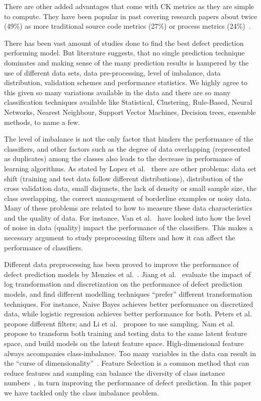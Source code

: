 \documentclass[sigconf,review, anonymous]{acmart}
\theoremstyle{break}
\theoremstyle{break}
\begin{document}
There are other added advantages that come with CK metrics as they are  simple  to  compute. They have been popular in past covering research papers about twice (49\%) 
as more traditional source code metrics (27\%) or process metrics (24\%)~\cite{radjenovic2013software}. 

There has been vast amount of studies done to find the best defect prediction performing model. But literature suggests, that no single prediction technique dominates and making sense of the many prediction results is hampered by the use of different data sets, data pre-processing, level of imbalance, data distribution, validation schemes and performance
statistics. We highly agree to this given so many variations available in the data 
and there are so many classification techniques available like Statistical, Clustering, Rule-Based, Neural Networks, Nearest Neighbour, Support Vector Machines, Decision trees, ensemble methods, to name a few.

The level of imbalance is not the only factor that hinders
the performance of the classifiers, and other factors
such as the degree of data overlapping (represented
as duplicates) among the classes also leads to the decrease in performance of
learning algorithms. As stated by Lopez et al.~\cite{lopez2014importance,lopez2012analysis} there
are other problems: data set shift (training and test
data follow different distributions), distribution of the
cross validation data, small disjuncts, the lack of density
or small sample size, the class overlapping, the
correct management of borderline examples or noisy
data. Many of these problems are related to how to
measure these data characteristics and the quality of
data. For instance, Van et al.~\cite{van2009knowledge}
have looked into how the level of noise in data (quality) impact the performance of the classifiers. This makes a necessary argument to study preprocessing filters and how it can affect the performance of classifiers. 

Different data preprocessing has been proved
to improve the performance of defect prediction models by
Menzies et al.~\cite{menzies2007data}. Jiang et al.~\cite{jiang2008can} evaluate the impact of
log transformation and discretization on the performance
of defect prediction models, and find different modelling
techniques ``prefer'' different transformation techniques. For
instance, Naive Bayes achieves better performance on discretized
data, while logistic regression achieves better performance
for both. Peters et al.~\cite{peters2013better} propose different filters; and Li et al.~\cite{li2012sample} propose
to use sampling. Nam et al.~\cite{nam2013transfer} propose to transform both
training and testing data to the same latent feature space,
and build models on the latent feature space.  High-dimensional feature always accompanies class-imbalance. Too many variables in the data
can result in the ``curse of dimensionality''~\cite{friedman1997bias}. Feature Selection is a common method that can
reduce features and sampling can balance the diversity of
class instance numbers~\cite{yin2015empirical}, in turn improving the performance of defect prediction. In this paper we have tackled only the class imbalance problem.
\end{document}
